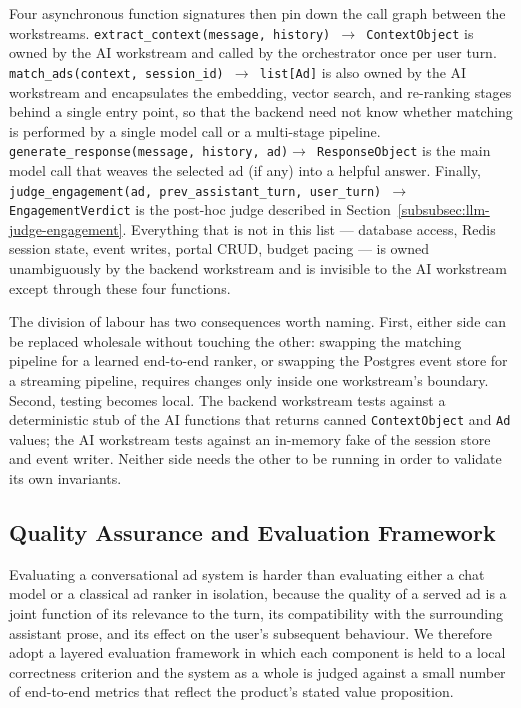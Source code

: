 Four asynchronous function signatures then pin down the call graph
between the workstreams. \texttt{extract\_context(message, history)
\(\to\) ContextObject} is owned by the AI workstream and called by the
orchestrator once per user turn. \texttt{match\_ads(context, session\_id)
\(\to\) list[Ad]} is also owned by the AI workstream and encapsulates
the embedding, vector search, and re-ranking stages behind a single
entry point, so that the backend need not know whether matching is
performed by a single model call or a multi-stage pipeline.
\texttt{generate\_response(message, history, ad)\(\to\) ResponseObject}
is the main model call that weaves the selected ad (if any) into a
helpful answer. Finally,
\texttt{judge\_engagement(ad, prev\_assistant\_turn, user\_turn) \(\to\)
EngagementVerdict} is the post-hoc judge described in
Section~\ref{subsubsec:llm-judge-engagement}. Everything that is not in
this list --- database access, Redis session state, event writes,
portal CRUD, budget pacing --- is owned unambiguously by the backend
workstream and is invisible to the AI workstream except through these
four functions.

The division of labour has two consequences worth naming. First, either
side can be replaced wholesale without touching the other: swapping the
matching pipeline for a learned end-to-end ranker, or swapping the
Postgres event store for a streaming pipeline, requires changes only
inside one workstream's boundary. Second, testing becomes local. The
backend workstream tests against a deterministic stub of the AI
functions that returns canned \texttt{ContextObject} and \texttt{Ad}
values; the AI workstream tests against an in-memory fake of the
session store and event writer. Neither side needs the other to be
running in order to validate its own invariants.

\subsection{Quality Assurance and Evaluation Framework}
\label{subsec:qa-framework}

Evaluating a conversational ad system is harder than evaluating either
a chat model or a classical ad ranker in isolation, because the quality
of a served ad is a joint function of its relevance to the turn, its
compatibility with the surrounding assistant prose, and its effect on
the user's subsequent behaviour. We therefore adopt a layered
evaluation framework in which each component is held to a local
correctness criterion and the system as a whole is judged against a
small number of end-to-end metrics that reflect the product's stated
value proposition.

